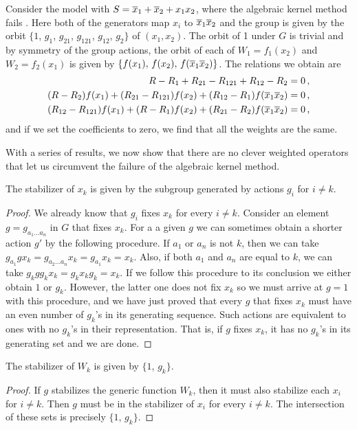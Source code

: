 \begin{exa} Consider the \classic \twoD model with $S = \overline{x}_1 + \overline{x}_2 + x_1x_2$, where the algebraic kernel method fails \cite[p.12]{bousquet2010walks}. Here both of the generators map $x_i$ to $\overline{x}_1 \overline{x}_2$ and the group is given by the orbit $\{1$, $g_1$, $g_{21}$, $g_{121}$, $g_{12}$, $g_2\}$ of $(x_1,x_2)$. The orbit of 1 under $G$ is trivial and by symmetry of the group actions, the orbit of each of $W_1 = f_1(x_2)$ and $W_2 = f_2(x_1)$ is given by $\{f(x_1),\, f(x_2),\, f(\overline{x}_1 \overline{x}_2)\}$. The relations we obtain are
\begin{align}
	R - R_1 + R_{21} - R_{121} + R_{12} - R_2 &= 0\,,\\
	(R-R_2)f(x_1) + (R_{21}-R_{121}) f(x_2) + (R_{12}-R_1)f(\overline{x}_1 \overline{x}_2) &= 0\,,\\
	(R_{12}-R_{121})f(x_1) + (R-R_1)f(x_2) + (R_{21}-R_2) f(\overline{x}_1 \overline{x}_2) &= 0\,,
\end{align}
and if we set the coefficients to zero, we find that all the weights are the same.
\end{exa}
With a series of results, we now show that there are no clever weighted operators that let us circumvent the failure of the algebraic kernel method.
\begin{lem} The stabilizer of $x_k$ is given by the subgroup generated by actions $g_i$ for $i \neq k$.
\end{lem}
\begin{proof} We already know that $g_i$ fixes $x_k$ for every $i \neq k$. Consider an element $g = g_{a_1\ldots a_n}$ in $G$ that fixes $x_k$. For a a given $g$ we can sometimes obtain a shorter action $g'$ by the following procedure. If $a_1$ or $a_n$ is not $k$, then we can take $g_{a_1}gx_k = g_{a_2\ldots a_n}x_k = g_{a_1}x_k = x_k$. Also, if both $a_1$ and $a_n$ are equal to $k$, we can take $g_k g g_k x_k = g_k x_k g_k = x_k$. If we follow this procedure to its conclusion we either obtain $1$ or $g_k$. However, the latter one does not fix $x_k$ so we must arrive at $g = 1$ with this procedure, and we have just proved that every $g$ that fixes $x_k$ must have an even number of $g_k$'s in its generating sequence. Such actions are equivalent to ones with no $g_k$'s in their representation. That is, if $g$ fixes $x_k$, it has no $g_k$'s in its generating set and we are done.
\end{proof}

\begin{lem} The stabilizer of $W_k$ is given by $\{1$, $g_k\}$.
\end{lem}
\begin{proof} If $g$ stabilizes the generic function $W_k$, then it must also stabilize each $x_i$ for $i \neq k$. Then $g$ must be in the stabilizer of $x_i$ for every $i \neq k$. The intersection of these sets is precisely $\{1$, $g_k\}$.
\end{proof}

